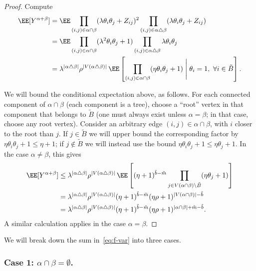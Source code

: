 \documentclass[11pt]{article}
\begin{document}
\begin{proof}
Compute
\begin{align}
\EE[Y^{\alpha+\beta}] &= \EE \prod_{(i,j) \in \alpha \cap \beta} (\lambda \theta_i \theta_j + Z_{ij})^2 \prod_{(i,j) \in \alpha \triangle \beta} (\lambda \theta_i \theta_j + Z_{ij}) \nonumber \\
&= \EE \prod_{(i,j) \in \alpha \cap \beta} (\lambda^2 \theta_i \theta_j + 1) \prod_{(i,j) \in \alpha \triangle \beta} \lambda \theta_i \theta_j \nonumber \\
&= \lambda^{|\alpha \triangle \beta|} \rho^{|V(\alpha \triangle \beta)|} \, \EE \left[\prod_{(i,j) \in \alpha \cap \beta} (\eta \theta_i \theta_j + 1) \;\Bigg|\; \theta_i = 1,~\forall i \in \tilde{B}\right].
\label{eq:eta-comparison}
\end{align}


\noindent We will bound the conditional expectation above, as follows. For each connected component of $\alpha \cap \beta$ (each component is a tree), choose a ``root'' vertex in that component that belongs to $\tilde{B}$ (one must always exist unless $\alpha = \beta$; in that case, choose any root vertex). Consider an arbitrary edge $(i,j) \in \alpha \cap \beta$, with $i$ closer to the root than $j$. If $j \in \tilde{B}$ we will upper bound the corresponding factor by $\eta \theta_i \theta_j + 1 \le \eta + 1$; if $j \notin \tilde{B}$ we will instead use the bound $\eta \theta_i \theta_j + 1 \le \eta \theta_j + 1$. In the case $\alpha \ne \beta$, this gives
\begin{align*}
\EE[Y^{\alpha+\beta}] &\le \lambda^{|\alpha \triangle \beta|} \rho^{|V(\alpha \triangle \beta)|} \, \EE \left[(\eta + 1)^{\tilde{b}-\tilde{m}} \prod_{j \in V(\alpha \cap \beta) \setminus \tilde{B}} (\eta \theta_j + 1)\right] \\
&= \lambda^{|\alpha \triangle \beta|} \rho^{|V(\alpha \triangle \beta)|} (\eta + 1)^{\tilde{b}-\tilde{m}} (\eta \rho + 1)^{|V(\alpha \cap \beta)| - \tilde{b}} \\
&= \lambda^{|\alpha \triangle \beta|} \rho^{|V(\alpha \triangle \beta)|} (\eta + 1)^{\tilde{b}-\tilde{m}} (\eta \rho + 1)^{|\alpha \cap \beta| + \tilde{m} - \tilde{b}}.
\end{align*}
A similar calculation applies in the case $\alpha = \beta$.
\end{proof}


We will break down the sum in~\eqref{eq:f-var} into three cases.

\subsubsection*{Case 1: $\alpha \cap \beta = \emptyset$.}
\end{document}
